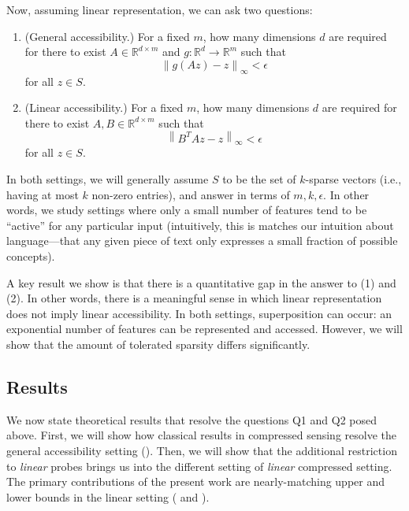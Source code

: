 \documentclass[11pt]{article}
\newcommand{\RR}{\mathbb{R}}
\newcommand{\norm}[1]{\left\|#1\right\|}
\begin{document}
Now, assuming linear representation, we can ask two questions:
\begin{enumerate}
    \item[Q1.] (General accessibility.) For a fixed $m$, how many dimensions $d$ are required for there to exist $A\in \RR^{d\times m}$ and $g:\RR^d\rightarrow \RR^m$ such that
    \begin{equation}
        \norm{g(Az) - z}_\infty < \epsilon
    \end{equation}
    for all $z\in S.$
    \item[Q2.] (Linear accessibility.) For a fixed $m$, how many dimensions $d$ are required for there to exist $A,B\in \RR^{d\times m}$ such that
    \begin{equation}
        \norm{B^TAz - z}_\infty < \epsilon
    \end{equation}
    for all $z\in S.$
\end{enumerate}
In both settings, we will generally assume $S$ to be the set of $k$-sparse vectors (i.e., having at most $k$ non-zero entries), and answer in terms of $m,k,\epsilon$. In other words, we study settings where only a small number of features tend to be ``active'' for any particular input (intuitively, this is matches our intuition about language---that any given piece of text only expresses a small fraction of possible concepts).

A key result we show is that there is a quantitative gap in the answer to (1) and (2). In other words, there is a meaningful sense in which linear representation does not imply linear accessibility. In both settings, superposition can occur: an exponential number of features can be represented and accessed. However, we will show that the amount of tolerated sparsity differs significantly.

\subsection{Results}\label{sec:results}
We now state theoretical results that resolve the questions Q1 and Q2 posed above. First, we will show how classical results in compressed sensing resolve the general accessibility setting (). Then, we will show that the additional restriction to \textit{linear} probes brings us into the different setting of \textit{linear} compressed setting. The primary contributions of the present work are nearly-matching upper and lower bounds in the linear setting ( and ).
\end{document}

